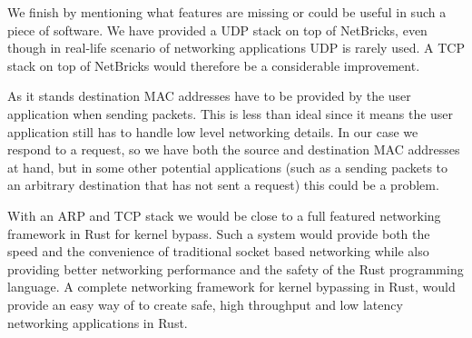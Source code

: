 We finish by mentioning what features are missing or could be useful
in such a piece of software. We have provided a UDP stack on top of
NetBricks, even though in real-life scenario of networking
applications UDP is rarely used. A TCP stack on top of NetBricks would
therefore be a considerable improvement.

As it stands destination MAC addresses have to be provided by the user
application when sending packets. This is less than ideal since it
means the user application still has to handle low level networking
details. In our case we respond to a request, so we have both the
source and destination MAC addresses at hand, but in some other
potential applications (such as a sending packets to an arbitrary
destination that has not sent a request) this could be a problem.

With an ARP and TCP stack we would be close to a full featured
networking framework in Rust for kernel bypass. Such a system would
provide both the speed and the convenience of traditional socket based
networking while also providing better networking performance and the
safety of the Rust programming language. A complete networking
framework for kernel bypassing in Rust, would provide an easy way of
to create safe, high throughput and low latency networking
applications in Rust.

